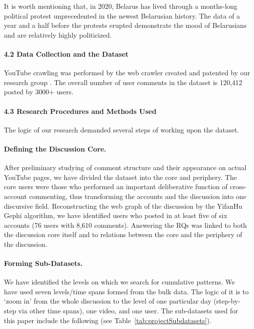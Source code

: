 It is worth mentioning that, in 2020, Belarus has lived through a months-long political protest unprecedented in the newest Belarusian history. The data of a year and a half before the protests erupted demonstrate the mood of Belarusians and are relatively highly politicized.

\paragraph{4.2 Data Collection and the Dataset}

YouTube crawling was performed by the web crawler created and patented by our research group \cite{BlekanovSergeevMartynenko}. The overall number of user comments in the dataset is 120,412 posted by 3000+ users.

\paragraph{4.3 Research Procedures and Methods Used}

The logic of our research demanded several steps of working upon the dataset.

\paragraph{Defining the Discussion Core.} After preliminary studying of comment structure and their appearance on actual YouTube pages, we have divided the dataset into the core and periphery. The core users were those who performed an important deliberative function of cross-account commenting, thus transforming the accounts and the discussion into one discursive field. Reconstructing the web graph of the discussion by the YifanHu Gephi algorithm, we have identified users who posted in at least five of six accounts (76 users with 8,610 comments). Answering the RQs was linked to both the discussion core itself and to relations between the core and the periphery of the discussion.

\paragraph{Forming Sub-Datasets.} We have identified the levels on which we search for cumulative patterns. We have used seven levels/time spans formed from the bulk data. The logic of it is to ‘zoom in’ from the whole discussion to the level of one particular day (step-by-step via other time spans), one video, and one user. The sub-datasets used for this paper include the following (see Table~\cref{tab:projectSubdatasets}).

